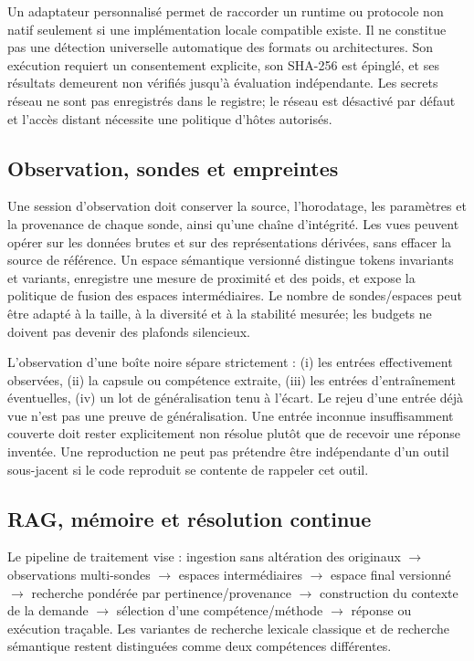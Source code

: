 Un adaptateur personnalisé permet de raccorder un runtime ou protocole non natif seulement si une implémentation locale compatible existe. Il ne constitue pas une détection universelle automatique des formats ou architectures. Son exécution requiert un consentement explicite, son SHA-256 est épinglé, et ses résultats demeurent non vérifiés jusqu'à évaluation indépendante. Les secrets réseau ne sont pas enregistrés dans le registre; le réseau est désactivé par défaut et l'accès distant nécessite une politique d'hôtes autorisés.

\subsection{Observation, sondes et empreintes}
Une session d'observation doit conserver la source, l'horodatage, les paramètres et la provenance de chaque sonde, ainsi qu'une chaîne d'intégrité. Les vues peuvent opérer sur les données brutes et sur des représentations dérivées, sans effacer la source de référence. Un espace sémantique versionné distingue tokens invariants et variants, enregistre une mesure de proximité et des poids, et expose la politique de fusion des espaces intermédiaires. Le nombre de sondes/espaces peut être adapté à la taille, à la diversité et à la stabilité mesurée; les budgets ne doivent pas devenir des plafonds silencieux.

L'observation d'une boîte noire sépare strictement : (i) les entrées effectivement observées, (ii) la capsule ou compétence extraite, (iii) les entrées d'entraînement éventuelles, (iv) un lot de généralisation tenu à l'écart. Le rejeu d'une entrée déjà vue n'est pas une preuve de généralisation. Une entrée inconnue insuffisamment couverte doit rester explicitement non résolue plutôt que de recevoir une réponse inventée. Une reproduction ne peut pas prétendre être indépendante d'un outil sous-jacent si le code reproduit se contente de rappeler cet outil.

\subsection{RAG, mémoire et résolution continue}
Le pipeline de traitement vise : ingestion sans altération des originaux $\to$ observations multi-sondes $\to$ espaces intermédiaires $\to$ espace final versionné $\to$ recherche pondérée par pertinence/provenance $\to$ construction du contexte de la demande $\to$ sélection d'une compétence/méthode $\to$ réponse ou exécution traçable. Les variantes de recherche lexicale classique et de recherche sémantique restent distinguées comme deux compétences différentes.

